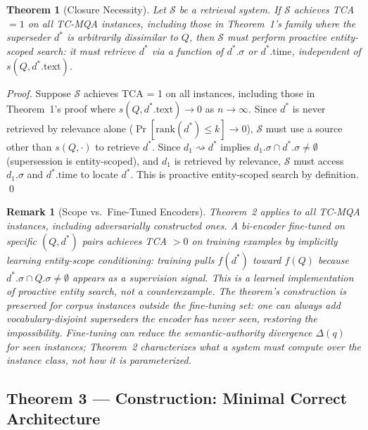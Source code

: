 \documentclass[11pt]{article}
\newtheorem{theorem}{Theorem}
\newtheorem{remark}{Remark}
\begin{document}
\begin{theorem}[Closure Necessity]
\label{thm:proactive}
Let $\mathcal{S}$ be a retrieval system. If $\mathcal{S}$ achieves TCA~$= 1$ on all TC-MQA instances, including those in Theorem~1's family where the superseder $d^*$ is arbitrarily dissimilar to $Q$, then $\mathcal{S}$ must perform proactive entity-scoped search: it must retrieve $d^*$ via a function of $d^*.\sigma$ or $d^*.\text{time}$, independent of $s(Q, d^*.\text{text})$.
\end{theorem}

\begin{proof}
Suppose $\mathcal{S}$ achieves TCA = 1 on all instances, including those in Theorem~1's proof where $s(Q, d^*.\text{text}) \to 0$ as $n \to \infty$. Since $d^*$ is never retrieved by relevance alone ($\Pr[\text{rank}(d^*) \leq k] \to 0$), $\mathcal{S}$ must use a source other than $s(Q, \cdot)$ to retrieve $d^*$. Since $d_1 \rightsquigarrow d^*$ implies $d_1.\sigma \cap d^*.\sigma \neq \emptyset$ (supersession is entity-scoped), and $d_1$ is retrieved by relevance, $\mathcal{S}$ must access $d_1.\sigma$ and $d^*.\text{time}$ to locate $d^*$. This is proactive entity-scoped search by definition. \qed
\end{proof}

\begin{remark}[Scope vs.\ Fine-Tuned Encoders]
\label{rem:finetuned}
Theorem~2 applies to all TC-MQA instances, including adversarially constructed ones. A bi-encoder fine-tuned on specific $(Q, d^*)$ pairs achieves TCA $> 0$ on training examples by implicitly learning entity-scope conditioning: training pulls $f(d^*)$ toward $f(Q)$ because $d^*.\sigma \cap Q.\sigma \neq \emptyset$ appears as a supervision signal. This is a learned implementation of proactive entity search, not a counterexample. The theorem's construction is preserved for corpus instances outside the fine-tuning set: one can always add vocabulary-disjoint superseders the encoder has never seen, restoring the impossibility. Fine-tuning can reduce the semantic-authority divergence $\Delta(q)$ for seen instances; Theorem~2 characterizes what a system must \emph{compute over the instance class}, not how it is parameterized.
\end{remark}

\subsection{Theorem 3 — Construction: Minimal Correct Architecture}
\end{document}
